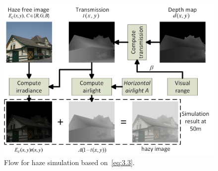 \begin{table}[htp]
\centering
{}
\caption{The visual range in HazeRD, and the corresponding weather condition and the scattering coefficient $\beta$.}
\label{table:3.coefficient}
\end{table}
\begin{figure}
\centering
\centerline{\includegraphics[width = 0.95\linewidth]{hazerd/simulation}}
\caption{Flow for haze simulation based on~\eqref{eq:3.3}.}
\label{fig:3.simu}
\end{figure}

